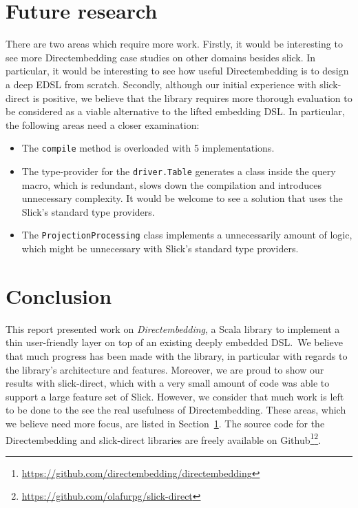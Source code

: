 \section{Future research} %
\label{sec:Future_research}
There are two areas which require more work.
Firstly, it would be interesting to see more Directembedding case studies on other domains besides slick.
In particular, it would be interesting to see how useful Directembedding is to design a deep EDSL from scratch.
Secondly, although our initial experience with slick-direct is positive, we believe that the library requires more thorough evaluation to be considered as a viable alternative to the lifted embedding DSL.
In particular, the following areas need a closer examination:
\begin{itemize}
    \item The \texttt{compile} method is overloaded with 5 implementations.
    \item The type-provider for the \texttt{driver.Table} generates a class inside the query macro, which is redundant, slows down the compilation and introduces unnecessary complexity. It would be welcome to see a solution that uses the Slick's standard type providers.
    \item The \texttt{ProjectionProcessing} class implements a unnecessarily amount of logic, which might be unnecessary with Slick's standard type providers.
\end{itemize}

\section{Conclusion} %
\label{sec:Conclusion}
This report presented work on \emph{Directembedding}, a Scala library to implement a thin user-friendly layer on top of an existing deeply embedded DSL.\
We believe that much progress has been made with the library, in particular with regards to the library's architecture and features.
Moreover, we are proud to show our results with slick-direct, which with a very small amount of code was able to support a large feature set of Slick.
However, we consider that much work is left to be done to the see the real usefulness of Directembedding.
These areas, which we believe need more focus, are listed in Section~\ref{sec:Future_research}.
The source code for the Directembedding and slick-direct libraries are freely available on Github\footnote{\href{https://github.com/directembedding/directembedding}{https://github.com/directembedding/directembedding}}\footnote{\href{https://github.com/olafurpg/slick-direct}{https://github.com/olafurpg/slick-direct}}.


